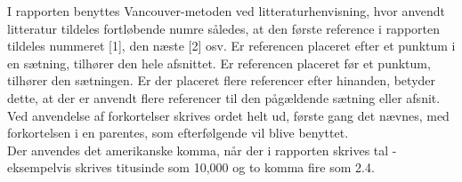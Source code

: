 I rapporten benyttes Vancouver-metoden ved litteraturhenvisning, hvor anvendt litteratur tildeles fortløbende numre således, at den første reference i rapporten tildeles nummeret [1], den næste [2] osv. Er referencen placeret efter et punktum i en sætning, tilhører den hele afsnittet. Er referencen placeret før et punktum, tilhører den sætningen. Er der placeret flere referencer efter hinanden, betyder dette, at der er anvendt flere referencer til den pågældende sætning eller afsnit. \\
Ved anvendelse af forkortelser skrives ordet helt ud, første gang det nævnes, med forkortelsen i en parentes, som efterfølgende vil blive benyttet. \\
Der anvendes det amerikanske komma, når der i rapporten skrives tal - eksempelvis skrives titusinde som 10,000 og to komma fire som 2.4.%

